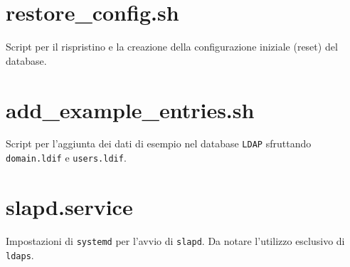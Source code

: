 \documentclass[11pt, a4paper, oneside]{article}
\begin{document}
		\section{restore\_config.sh}
			\par
				Script per il rispristino e la creazione della 
				configurazione iniziale (reset) del database.
			
			\newpage
		\section{add\_example\_entries.sh}
			\par
				Script per l'aggiunta dei dati di esempio nel 
				database \texttt{LDAP} sfruttando 
				\texttt{domain.ldif} e \texttt{users.ldif}.
			
			\newpage
		\section{slapd.service}
			\par
				Impostazioni di \texttt{systemd} per l'avvio di 
				\texttt{slapd}. Da notare l'utilizzo esclusivo 
				di \texttt{ldaps}.
			
			\newpage
	
\end{document}
